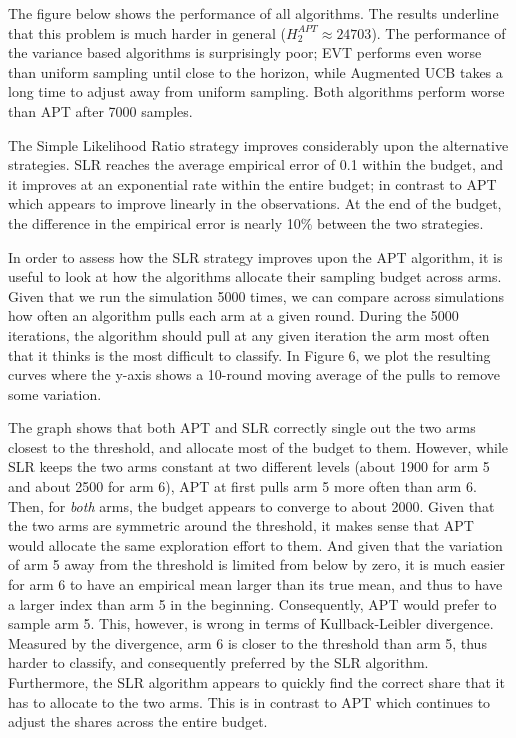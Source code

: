 \documentclass[11pt,]{article}
\begin{document}
The figure below shows the performance of all algorithms. The results
underline that this problem is much harder in general
(\(H_2^{APT} \approx 24703\)). The performance of the variance based
algorithms is surprisingly poor; EVT performs even worse than uniform
sampling until close to the horizon, while Augmented UCB takes a long
time to adjust away from uniform sampling. Both algorithms perform worse
than APT after 7000 samples.

The Simple Likelihood Ratio strategy improves considerably upon the
alternative strategies. SLR reaches the average empirical error of 0.1
within the budget, and it improves at an exponential rate within the
entire budget; in contrast to APT which appears to improve linearly in
the observations. At the end of the budget, the difference in the
empirical error is nearly 10\% between the two strategies.

In order to assess how the SLR strategy improves upon the APT algorithm,
it is useful to look at how the algorithms allocate their sampling
budget across arms. Given that we run the simulation 5000 times, we can
compare across simulations how often an algorithm pulls each arm at a
given round. During the 5000 iterations, the algorithm should pull at
any given iteration the arm most often that it thinks is the most
difficult to classify. In Figure 6, we plot the resulting curves where
the y-axis shows a 10-round moving average of the pulls to remove some
variation.

The graph shows that both APT and SLR correctly single out the two arms
closest to the threshold, and allocate most of the budget to them.
However, while SLR keeps the two arms constant at two different levels
(about 1900 for arm 5 and about 2500 for arm 6), APT at first pulls arm
5 more often than arm 6. Then, for \emph{both} arms, the budget appears
to converge to about 2000. Given that the two arms are symmetric around
the threshold, it makes sense that APT would allocate the same
exploration effort to them. And given that the variation of arm 5 away
from the threshold is limited from below by zero, it is much easier for
arm 6 to have an empirical mean larger than its true mean, and thus to
have a larger index than arm 5 in the beginning. Consequently, APT would
prefer to sample arm 5. This, however, is wrong in terms of
Kullback-Leibler divergence. Measured by the divergence, arm 6 is closer
to the threshold than arm 5, thus harder to classify, and consequently
preferred by the SLR algorithm. Furthermore, the SLR algorithm appears
to quickly find the correct share that it has to allocate to the two
arms. This is in contrast to APT which continues to adjust the shares
across the entire budget.
\end{document}
